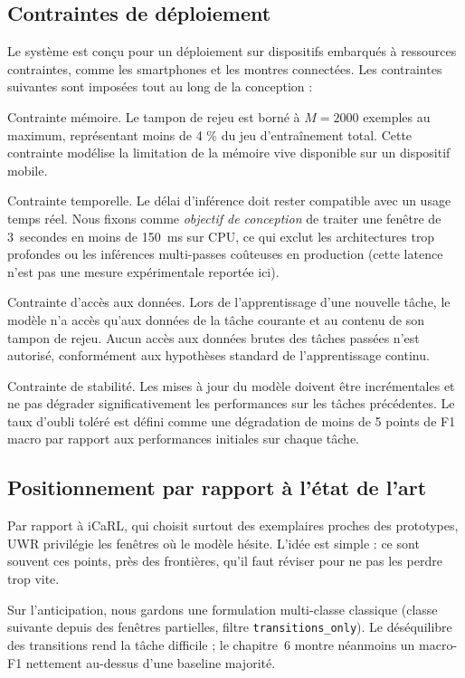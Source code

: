 \subsection{Contraintes de déploiement}

Le système est conçu pour un déploiement sur dispositifs embarqués à ressources contraintes, comme les smartphones et les montres connectées. Les contraintes suivantes sont imposées tout au long de la conception :

Contrainte mémoire. Le tampon de rejeu est borné à $M = 2000$ exemples au maximum, représentant moins de 4 \% du jeu d'entraînement total. Cette contrainte modélise la limitation de la mémoire vive disponible sur un dispositif mobile.

Contrainte temporelle. Le délai d'inférence doit rester compatible avec un usage
temps réel. Nous fixons comme \emph{objectif de conception} de traiter une
fenêtre de 3~secondes en moins de 150~ms sur CPU, ce qui exclut les
architectures trop profondes ou les inférences multi-passes coûteuses en
production (cette latence n'est pas une mesure expérimentale reportée ici).

Contrainte d'accès aux données. Lors de l'apprentissage d'une nouvelle tâche, le modèle n'a accès qu'aux données de la tâche courante et au contenu de son tampon de rejeu. Aucun accès aux données brutes des tâches passées n'est autorisé, conformément aux hypothèses standard de l'apprentissage continu.

Contrainte de stabilité. Les mises à jour du modèle doivent être incrémentales et ne pas dégrader significativement les performances sur les tâches précédentes. Le taux d'oubli toléré est défini comme une dégradation de moins de 5 points de F1 macro par rapport aux performances initiales sur chaque tâche.

\subsection{Positionnement par rapport à l'état de l'art}

Par rapport à iCaRL, qui choisit surtout des exemplaires proches des
prototypes, UWR privilégie les fenêtres où le modèle hésite. L'idée est
simple : ce sont souvent ces points, près des frontières, qu'il faut
réviser pour ne pas les perdre trop vite.

Sur l'anticipation, nous gardons une formulation multi-classe classique
(classe suivante depuis des fenêtres partielles, filtre
\texttt{transitions\_only}). Le déséquilibre des transitions rend la tâche
difficile ; le chapitre~6 montre néanmoins un macro-F1 nettement au-dessus
d'une baseline majorité.

